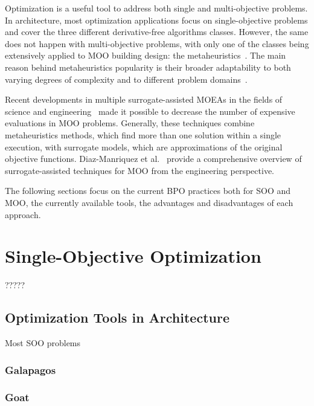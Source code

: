 	Optimization is a useful tool to address both single and multi-objective problems. In architecture, most optimization applications focus on single-objective problems and cover the three different derivative-free algorithms classes. However, the same does not happen with multi-objective problems, with only one of the classes being extensively applied to \ac{MOO} building design: the metaheuristics~\cite{Hamdy2016}. The main reason behind metaheuristics popularity is their broader adaptability to both varying degrees of complexity and to different problem domains~\cite{BlumRoli2003Metaheuristics}.
	
	Recent developments in multiple surrogate-assisted \acp{MOEA} in the fields of science and engineering~\cite{Zapotecas-Martinez2016,Hussein2016} made it possible to decrease the number of expensive evaluations in \ac{MOO} problems. Generally, these techniques combine metaheuristics methods, which find more than one solution within a single execution, with surrogate models, which are approximations of the original objective functions. Diaz-Manriquez et al.~\cite{Diaz-Manriquez2016} provide a comprehensive overview of surrogate-assisted techniques for \ac{MOO} from the engineering perspective. 

	The following sections focus on the current \ac{BPO} practices both for \ac{SOO} and \ac{MOO}, the currently available tools, the advantages and disadvantages of each approach.
	
\section{Single-Objective Optimization}

?????

\subsection{Optimization Tools in Architecture}

	Most \ac{SOO} problems 

\subsubsection{Galapagos}

\subsubsection{Goat}


